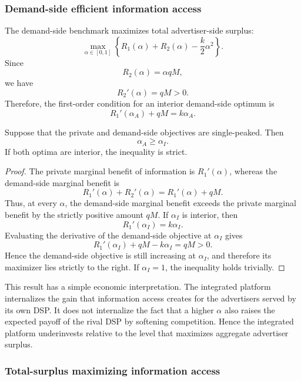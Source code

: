 \subsubsection{Demand-side efficient information access}

The demand-side benchmark maximizes total advertiser-side surplus:
\[
\max_{\alpha\in[0,1]}
\left\{
R_1(\alpha)+R_2(\alpha)-\frac{k}{2}\alpha^2
\right\}.
\]
Since
\[
R_2(\alpha)=\alpha qM,
\]
we have
\[
R_2'(\alpha)=qM>0.
\]
Therefore, the first-order condition for an interior demand-side optimum is
\[
R_1'(\alpha_A)+qM=k\alpha_A.
\]

\begin{prop}
Suppose that the private and demand-side objectives are single-peaked. Then
\[
\alpha_A\ge \alpha_I.
\]
If both optima are interior, the inequality is strict.
\end{prop}

\begin{proof}
The private marginal benefit of information is $R_1'(\alpha)$, whereas the demand-side marginal
benefit is
\[
R_1'(\alpha)+R_2'(\alpha)=R_1'(\alpha)+qM.
\]
Thus, at every $\alpha$, the demand-side marginal benefit exceeds the private marginal benefit
by the strictly positive amount $qM$. If $\alpha_I$ is interior, then
\[
R_1'(\alpha_I)=k\alpha_I.
\]
Evaluating the derivative of the demand-side objective at $\alpha_I$ gives
\[
R_1'(\alpha_I)+qM-k\alpha_I=qM>0.
\]
Hence the demand-side objective is still increasing at $\alpha_I$, and therefore its maximizer
lies strictly to the right. If $\alpha_I=1$, the inequality holds trivially.
\end{proof}

This result has a simple economic interpretation. The integrated platform internalizes the gain
that information access creates for the advertisers served by its own DSP. It does not internalize
the fact that a higher $\alpha$ also raises the expected payoff of the rival DSP by softening
competition. Hence the integrated platform underinvests relative to the level that maximizes
aggregate advertiser surplus.

\subsubsection{Total-surplus maximizing information access}

